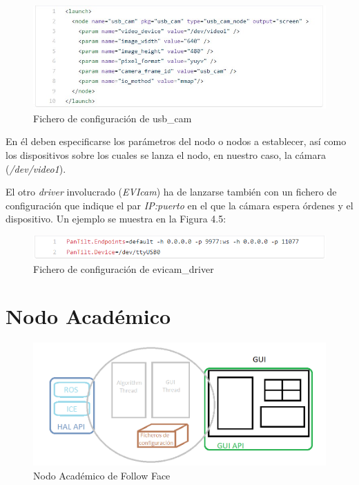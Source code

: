 \begin{figure}[H]
  \begin{center}
    \includegraphics[width=0.99\linewidth]{figures/usbcamconf.jpg}
		\caption{Fichero de configuración de usb\_cam}
		\label{fig.usbcamconf}
		\end{center}
\end{figure}

En él deben especificarse los parámetros del nodo o nodos a establecer, así como los dispositivos sobre los cuales se lanza el nodo, en nuestro caso, la cámara (\textit{/dev/video1}).

El otro \textit{driver} involucrado (\textit{EVIcam}) ha de lanzarse también con un fichero de configuración que indique el par \textit{IP:puerto} en el que la cámara espera órdenes y el dispositivo. Un ejemplo se muestra en la Figura 4.5:

\begin{figure}[H]
  \begin{center}
    \includegraphics[width=0.99\linewidth]{figures/evicamconf.png}
		\caption{Fichero de configuración de evicam\_driver}
		\label{fig.evicamconf}
		\end{center}
\end{figure}
 
\section{Nodo Académico}

\begin{figure}[H]
  \begin{center}
    \includegraphics[width=0.99\linewidth]{figures/nodoacademicoff.png}
		\caption{Nodo Académico de Follow Face}
		\label{fig.nodoff}
		\end{center}
\end{figure}

